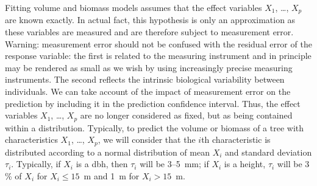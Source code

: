 Fitting volume and biomass models assumes that the effect variables $X_1$, \ldots, $X_p$ are known exactly. In actual fact, this hypothesis is only an approximation as these variables are measured and are therefore subject to measurement error. Warning: measurement error should not be confused with the residual error of the response variable: the first is related to the measuring instrument and in principle may be rendered as small as we wish by using increasingly precise measuring instruments. The second reflects the intrinsic biological variability between individuals. We can take account of the impact of measurement error on the prediction by including it in the prediction confidence interval. Thus, the effect variables $X_1$, \ldots, $X_p$
are no longer considered as fixed, but as being contained within a distribution. Typically, to predict the volume or biomass of a tree with characteristics $X_1$, \ldots, $X_p$, we will consider that the $i$th characteristic is distributed according to a normal distribution of mean $X_i$ and standard deviation $\tau_i$.
Typically, if $X_i$ is a dbh, then $\tau_i$ will be 3--5~mm; if $X_i$ is a height, $\tau_i$ will be 3\,\% of $X_i$ for $X_i\leq15$~m and 1~m for $X_i>15$~m.

